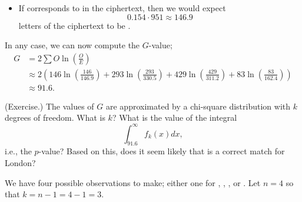 \documentclass[letterpaper]{article}
\begin{document}
\begin{enumerate}
\begin{itemize}
        \item If  corresponds to  in the ciphertext, then we would expect \[0.154 \cdot 951 \approx 146.9\] letters of the ciphertext to be . 
    \end{itemize}
    In any case, we can now compute the $G$-value; 
    \begin{equation*}
        \begin{aligned}
            G &= 2 \sum O\ln\left(\frac{O}{E}\right) \\ 
                &\approx 2\left(146 \ln\left(\frac{146}{146.9}\right) + 293 \ln\left(\frac{293}{330.5}\right) + 429 \ln\left(\frac{429}{311.2}\right) + 83 \ln\left(\frac{83}{162.4}\right) \right) \\ 
                &\approx 91.6.
        \end{aligned}
    \end{equation*}

    \begin{mdframed}
        (Exercise.) The values of $G$ are approximated by a chi-square distribution with $k$ degrees of freedom. What is $k$? What is the value of the integral \[\int_{91.6}^{\infty} f_{k}(x) dx,\] i.e., the $p$-value? Based on this, does it seem likely that  is a correct match for London? 
        \begin{mdframed}
            We have four possible observations to make; either one for , , , or . Let $n = 4$ so that $k = n - 1 = 4 - 1 = 3$.
        \end{mdframed}
    \end{mdframed}


\end{enumerate}
\end{document}
